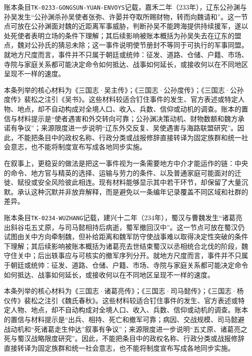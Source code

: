 账本条目\texttt{TK-0233-GONGSUN-YUAN-ENVOYS}记载，嘉禾二年（233年），辽东公孙渊与孙吴发生“公孙渊杀孙吴使者张弥、许晏并夺取所赐财物，转而向魏请和”。这一节点可放在公孙渊面对魏的近距离军事威胁，判断孙吴不能跨海提供持续援军，遂以处死使者表明立场的条件下理解；其后续影响被账本概括为孙吴失去在辽东的盟点，魏对公孙氏的猜忌未除；这一事件说明使节册封不等同于可执行的军事同盟。就地方尺度而言，事件并不只属于朝廷或统帅：征发、道路、仓储、户籍、市场、寺院与家庭关系都可能决定命令如何抵达、战事如何延长，或接收何以在不同地区呈现不一样的速度。

本条列举的核心材料为《三国志·吴主传》；《三国志·公孙度传》；《三国志·公孙度传》裴松之注引《吴书》。这些材料较适合钉住事件的发生、官方表述或特定人物、地点，却不自动构成对全境人口、收入、兵数、信仰或动机的调查。账本的置信与材料提示是“使者遇害和外交转向可靠；公孙渊决策动机、财物数额和魏方承诺有争议”；来源限度进一步说明“辽东外交反复、吴使遇害与海路联盟研究”。因此，不能把条目中的政权名称、行政分类或战报修辞直接转译为固定族群和统一社会意志，也不能将制度宣布写成各地同步实施。

在叙事上，更稳妥的做法是把这一事件视为一条需要地方中介才能运作的链：中央的命令、地方官与精英的选择、运输与劳力的条件、以及普通家庭可能面对的迁徙、赋役或安全风险彼此相连。现有材料能够显示其中若干环节，却保留了大量沉默。承认这种沉默并非放弃解释，而是避免以一条编年记录覆盖不同区域和社群的差异。

账本条目\texttt{TK-0234-WUZHANG}记载，建兴十二年（234年），蜀汉与曹魏发生“诸葛亮出斜谷屯五丈原，与司马懿相持后病逝，蜀军撤回汉中”。这一节点可放在蜀汉仍试图由关中方向牵制魏，但补给距离和魏军防守使战事难以取得决定性突破的条件下理解；其后续影响被账本概括为诸葛亮去世结束蜀汉以丞相统合北伐的阶段，魏守住关中；后出轶事应与可核实的撤军序列分开。就地方尺度而言，事件并不只属于朝廷或统帅：征发、道路、仓储、户籍、市场、寺院与家庭关系都可能决定命令如何抵达、战事如何延长，或接收何以在不同地区呈现不一样的速度。

本条列举的核心材料为《三国志·诸葛亮传》；《三国志·司马懿传》；《三国志·杨仪传》裴松之注引《魏氏春秋》。这些材料较适合钉住事件的发生、官方表述或特定人物、地点，却不自动构成对全境人口、收入、兵数、信仰或动机的调查。账本的置信与材料提示是“出兵、相持、死亡和撤军可靠；病因、交战规模、司马懿避战动机和“死诸葛走生仲达”叙事有争议”；来源限度进一步说明“五丈原、诸葛亮之死与蜀汉战略限度研究”。因此，不能把条目中的政权名称、行政分类或战报修辞直接转译为固定族群和统一社会意志，也不能将制度宣布写成各地同步实施。

